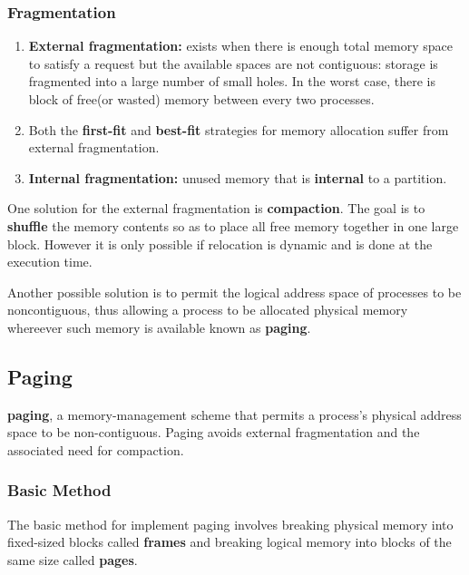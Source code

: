 \documentclass[10pt]{article}
\newcommand{\tf}{\textbf}
\begin{document}
\subsubsection{Fragmentation}

\begin{enumerate}
	\item \tf{External fragmentation:} exists when there is enough total memory space to satisfy a request but the available spaces are not contiguous: storage is fragmented into a large number of small holes. In the worst case, there is block of free(or wasted) memory between every two processes.
	\item Both the \tf{first-fit} and \tf{best-fit} strategies for memory allocation suffer from external fragmentation.
	\item \tf{Internal fragmentation:} unused memory that is \tf{internal} to a partition.
\end{enumerate}

\par{One solution for the external fragmentation is \tf{compaction}. The goal is to \tf{shuffle} the memory contents so as to place all free memory together in one large block. However it is only possible if relocation is dynamic and is done at the execution time.} \\

\par{Another possible solution is to permit the logical address space of processes to be noncontiguous, thus allowing a process to be allocated physical memory whereever such memory is available known as \tf{paging}.}

\subsection{Paging}

\par{\tf{paging}, a memory-management scheme that permits a process's physical address space to be non-contiguous. Paging avoids external fragmentation and the associated need for compaction.}

\subsubsection{Basic Method}

\par{The basic method for implement paging involves breaking physical memory into fixed-sized blocks called \tf{frames} and breaking logical memory into blocks of the same size called \tf{pages}.} \\
\end{document}

